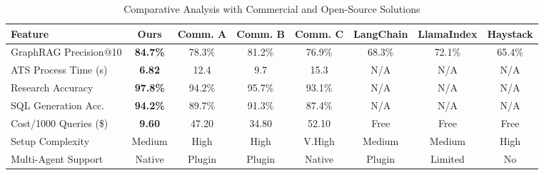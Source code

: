 \begin{table}[t]
\centering
\caption{Comparative Analysis with Commercial and Open-Source Solutions}
\label{tab:comparative}
\begin{tabular}{lccccccc}
\toprule
\textbf{Feature} & \textbf{Ours} & \textbf{Comm. A} & \textbf{Comm. B} & \textbf{Comm. C} & \textbf{LangChain} & \textbf{LlamaIndex} & \textbf{Haystack} \\
\midrule
GraphRAG Precision@10 & \textbf{84.7\%} & 78.3\% & 81.2\% & 76.9\% & 68.3\% & 72.1\% & 65.4\% \\
ATS Process Time (s)  & \textbf{6.82}   & 12.4   & 9.7    & 15.3   & N/A    & N/A    & N/A \\
Research Accuracy     & \textbf{97.8\%} & 94.2\% & 95.7\% & 93.1\% & N/A    & N/A    & N/A \\
SQL Generation Acc.   & \textbf{94.2\%} & 89.7\% & 91.3\% & 87.4\% & N/A    & N/A    & N/A \\
Cost/1000 Queries (\$)& \textbf{9.60}   & 47.20  & 34.80  & 52.10  & Free   & Free   & Free \\
Setup Complexity      & Medium          & High   & High   & V.High & Medium & Medium & High \\
Multi-Agent Support   & Native          & Plugin & Plugin & Native & Plugin & Limited& No \\
\bottomrule
\end{tabular}
\end{table}
